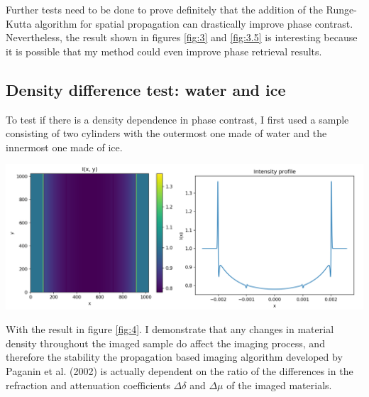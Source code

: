 \documentclass[9pt, a4paper]{article}
\newenvironment{Figure}
    {\par\medskip\noindent\minipage{\linewidth}}
    {\endminipage\par\medskip}
\begin{document}
Further tests need to be done to prove definitely that the addition of the Runge-Kutta algorithm for spatial propagation can drastically improve phase contrast. Nevertheless, the result shown in figures \ref{fig:3} and \ref{fig:3.5} is interesting because it is possible that my method could even improve phase retrieval results.

\subsection{Density difference test: water and ice}
To test if there is a density dependence in phase contrast, I first used a sample consisting of two cylinders with the outermost one made of water and the innermost one made of ice.
\begin{Figure}\label{fig:4}
\centering
\includegraphics[width=\linewidth]{ice_water_AS.pdf}
\end{Figure}
With the result in figure \ref{fig:4}. I demonstrate that any changes in material density throughout the imaged sample do affect the imaging process, and therefore the stability the propagation based imaging algorithm developed by Paganin et al. (2002) is actually dependent on the ratio of the differences in the refraction and attenuation coefficients $\Delta \delta$ and $\Delta \mu$ of the imaged materials.
\end{document}
